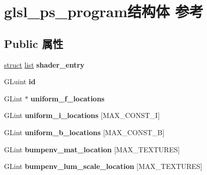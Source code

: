 \hypertarget{structglsl__ps__program}{}\section{glsl\+\_\+ps\+\_\+program结构体 参考}
\label{structglsl__ps__program}
\subsection*{Public 属性}
\begin{DoxyCompactItemize}
\item 
\mbox{\label{structglsl__ps__program_a4c08644488d5a40849049e7ea285a2f1}} 
\hyperlink{interfacestruct}{struct} \hyperlink{classlist}{list} {\bfseries shader\+\_\+entry}
\item 
\mbox{\label{structglsl__ps__program_aa05a51d4549b5a64691e9d803415d2c5}} 
G\+Luint {\bfseries id}
\item 
\mbox{\label{structglsl__ps__program_a8b93a77cf37c8b9d7efc8cd6e2ba372e}} 
G\+Lint $\ast$ {\bfseries uniform\+\_\+f\+\_\+locations}
\item 
\mbox{\label{structglsl__ps__program_a1c7537d504b15ebb593c370adb07b0d2}} 
G\+Lint {\bfseries uniform\+\_\+i\+\_\+locations} \mbox{[}M\+A\+X\+\_\+\+C\+O\+N\+S\+T\+\_\+I\mbox{]}
\item 
\mbox{\label{structglsl__ps__program_a20c472a81fb5a5fa85a54d2409e299c2}} 
G\+Lint {\bfseries uniform\+\_\+b\+\_\+locations} \mbox{[}M\+A\+X\+\_\+\+C\+O\+N\+S\+T\+\_\+B\mbox{]}
\item 
\mbox{\label{structglsl__ps__program_acb84746b8f3c7c646deb1e722a3b1be5}} 
G\+Lint {\bfseries bumpenv\+\_\+mat\+\_\+location} \mbox{[}M\+A\+X\+\_\+\+T\+E\+X\+T\+U\+R\+ES\mbox{]}
\item 
\mbox{\label{structglsl__ps__program_a43d3a029d5ecda17a57551128f785211}} 
G\+Lint {\bfseries bumpenv\+\_\+lum\+\_\+scale\+\_\+location} \mbox{[}M\+A\+X\+\_\+\+T\+E\+X\+T\+U\+R\+ES\mbox{]}
\item 
\mbox{\label{structglsl__ps__program_ada4b34b0c570e936efbebe42409ab117}} 

\end{DoxyCompactItemize}
